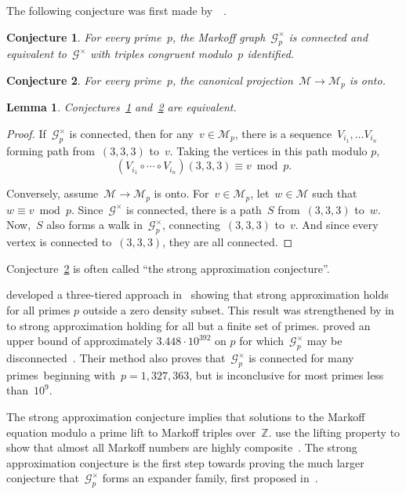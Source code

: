 \documentclass{article}
\newtheorem{lemma}{Lemma}
\newtheorem{conjecture}{Conjecture}
\theoremstyle{definition}
\theoremstyle{remark}
\begin{document}
The following conjecture was first made by~\citeauthor{strong-approx}~\cite{strong-approx}.

\begin{conjecture}\label{con:graphs-connected}
    For every prime~$p$, the Markoff graph~$\mathcal{G}^\times_p$ is connected and equivalent to~$\mathcal{G}^\times$ with triples congruent modulo~$p$ identified.
\end{conjecture}
\begin{conjecture}\label{con:triples-onto}
    For every prime~$p$, the canonical projection~$\mathcal{M} \to \mathcal{M}_p$ is onto.
\end{conjecture}

\begin{lemma}
    Conjectures~\ref{con:graphs-connected} and~\ref{con:triples-onto} are equivalent.
\end{lemma}
\begin{proof}
    If~$\mathcal{G}^\times_p$ is connected, then for any~$v \in \mathcal{M}_p$, there is a sequence~$V_{i_1},\dots V_{i_n}$ forming path from~$(3, 3, 3)$ to~$v$.
    Taking the vertices in this path modulo $p$,
    \[ (V_{i_1} \circ \cdots \circ V_{i_n})(3, 3, 3) \equiv v \bmod p. \]

    Conversely, assume~$\mathcal{M} \to \mathcal{M}_p$ is onto.
    For~$v \in \mathcal{M}_p$, let~$w \in \mathcal{M}$ such that~$w \equiv v \bmod p$.
    Since~$\mathcal{G}^\times$ is connected, there is a path~$S$ from~$(3, 3, 3)$ to~$w$.
    Now,~$S$ also forms a walk in~$\mathcal{G}^\times_p$, connecting~$(3, 3, 3)$ to~$v$.
    And since every vertex is connected to~$(3, 3, 3)$, they are all connected.
\end{proof}
Conjecture~\ref{con:triples-onto} is often called ``the strong approximation conjecture''.

\citeauthor{bgs} developed a three-tiered approach in~\cite{bgs} showing that strong approximation holds for all primes $p$ outside a zero density subset.
This result was strengthened by \citeauthor{chen} in~\cite{chen} to strong approximation holding for all but a finite set of primes.
\citeauthor{fuchs} proved an upper bound of approximately $3.448 \cdot 10^{392}$ on $p$ for which~$\mathcal{G}_p^\times$ may be disconnected~\cite{fuchs}.
Their method also proves that~$\mathcal{G}_p^\times$ is connected for many primes~beginning with~$p = 1,327,363$, but is inconclusive for most primes less than~$10^9$.

The strong approximation conjecture implies that solutions to the Markoff equation modulo a prime lift to Markoff triples over~$\mathbb{Z}$.
\citeauthor{bgs} use the lifting property to show that almost all Markoff numbers are highly composite~\cite[Theorem 18]{bgs}.
The strong approximation conjecture is the first step towards proving the much larger conjecture that~$\mathcal{G}_p^\times$ forms an expander family, first proposed in~\cite{bgs}.
\end{document}
